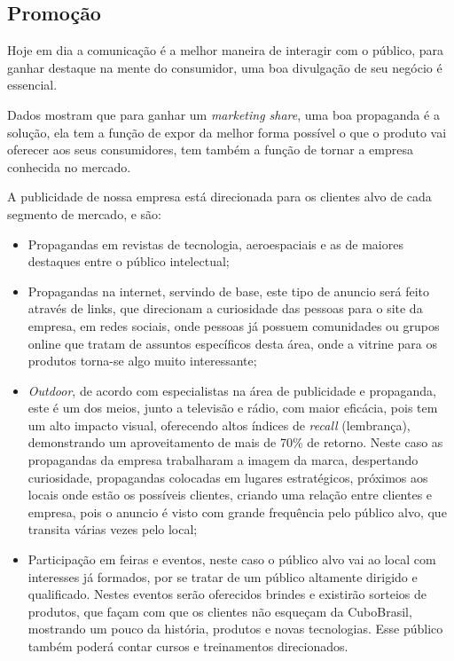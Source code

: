 \documentclass[
	12pt,				%
	openright,			%
	oneside,			%
	a4paper,			%
	english,			%
	french,				%
	spanish,			%
	brazil				%
	]{abntex2}
\begin{document}
\subsection[Promoção]{Promoção}
	
	Hoje em dia a comunicação é a melhor maneira de interagir com o público, para ganhar destaque na mente do consumidor, uma boa divulgação de seu negócio é essencial.
	
  	Dados mostram que para ganhar um \textit{marketing share}, uma boa propaganda é a solução, ela tem a função de expor da melhor forma possível o que o produto vai oferecer aos seus consumidores, tem também a função de tornar a empresa conhecida no mercado.
  	
	A publicidade de nossa empresa está direcionada para os clientes alvo de cada segmento de mercado, e são:
	
	\begin{itemize}
		\item Propagandas em revistas de tecnologia, aeroespaciais e as de maiores destaques entre o público intelectual;
		\item Propagandas na internet, servindo de base, este tipo de anuncio será feito através de links, que direcionam a curiosidade das pessoas para o site da empresa, em redes sociais, onde pessoas já possuem comunidades ou grupos online que tratam de assuntos específicos desta área, onde a vitrine para os produtos torna-se algo muito interessante;
		\item \textit{Outdoor}, de acordo com especialistas na área de publicidade e propaganda, este é um dos meios, junto a televisão e rádio, com maior eficácia, pois tem um alto impacto visual, oferecendo altos índices de \textit{recall} (lembrança), demonstrando um aproveitamento de mais de 70\% de retorno. Neste caso as propagandas da empresa trabalharam a imagem da marca, despertando curiosidade, propagandas colocadas em lugares estratégicos, próximos aos locais onde estão os possíveis clientes, criando uma relação entre clientes e empresa, pois o anuncio é visto com grande frequência pelo público alvo, que transita várias vezes pelo local;
		\item Participação em feiras e eventos, neste caso o público alvo vai ao local com interesses já formados, por se tratar de um público altamente dirigido e qualificado. Nestes eventos serão oferecidos brindes e existirão sorteios de produtos, que façam com que os clientes não esqueçam da CuboBrasil, mostrando um pouco da história, produtos e novas tecnologias. Esse público também poderá contar cursos e treinamentos direcionados.	
	\end{itemize}
\end{document}
